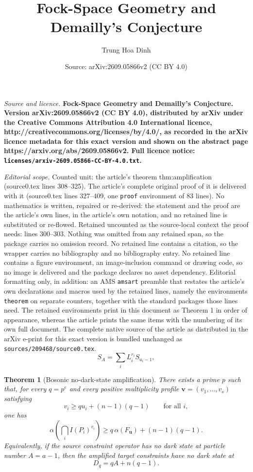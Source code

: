 \documentclass[10pt,a4paper]{amsart}
\title{\bfseries Fock-Space Geometry and Demailly's Conjecture}
\author{Trung Hoa Dinh}
\date{Source: arXiv:2609.05866v2 (CC BY 4.0)}
\newtheorem{theorem}{Theorem}
\begin{document}
\maketitle

\noindent\emph{Source and licence.} \bfseries Fock-Space Geometry and Demailly's Conjecture. Version arXiv:2609.05866v2 (CC BY 4.0), distributed by arXiv under the Creative Commons Attribution 4.0 International licence, http://creativecommons.org/licenses/by/4.0/, as recorded in the arXiv licence metadata for this exact version and shown on the abstract page https://arxiv.org/abs/2609.05866v2. Full licence notice: \texttt{licenses/arxiv-2609.05866-CC-BY-4.0.txt}.\par\smallskip

\noindent\textit{Editorial scope.} Counted unit: the article's theorem thm:amplification (source0.tex lines 308--325). The article's complete original proof of it is delivered with it (source0.tex lines 327--409, one \texttt{proof} environment of 83 lines). No mathematics is written, repaired or re-derived: the statement and the proof are the article's own lines, in the article's own notation, and no retained line is substituted or re-flowed.  Retained uncounted as the source-local context the proof needs: lines 300--303.  Nothing was omitted from any retained span, so the package carries no omission record.  No retained line contains a citation, so the wrapper carries no bibliography and no bibliography entry.  No retained line contains a figure environment, an image-inclusion command or drawing code, so no image is delivered and the package declares no asset dependency.  Editorial formatting only, in addition: an AMS \texttt{amsart} preamble that restates the article's own declarations and macros used by the retained lines, namely the environments \texttt{theorem} on separate counters, together with the standard packages those lines need.  The retained environments print in this document as Theorem 1 in order of appearance, whereas the article prints the same items with the numbering of its own full document.  The complete native source of the article as distributed in the arXiv e-print for this exact version is bundled unchanged as \texttt{sources/209468/source0.tex}.
\begin{equation}
  S_A=\sum_i L_i^{r_i}S_{u_i-1},
  \label{eq:sourcecoverage}
\end{equation}

\begin{theorem}[Bosonic no-dark-state amplification]
\label{thm:amplification}
There exists a prime $p$ such that, for every $q=p^e$ and every positive multiplicity profile $\mathbf v=(v_1,\ldots,v_s)$ satisfying
\[
  v_i\ge q u_i+(n-1)(q-1)
  \qquad\text{for all }i,
\]
one has
\begin{equation}
  \alpha\!\left(\bigcap_iI(P_i)^{v_i}\right)
  \ge q\,\alpha(F_{\mathbf u})+(n-1)(q-1).
  \label{eq:amplification}
\end{equation}
Equivalently, if the source constraint operator has no dark state at particle number $A=a-1$, then the amplified target constraints have no dark state at
\[
  D_q=qA+n(q-1).
\]
\end{theorem}
\end{document}
